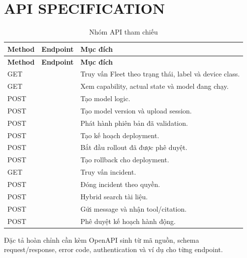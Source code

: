 \chapter{API SPECIFICATION}

\begin{longtable}{L{2.2cm}L{5cm}L{7.2cm}}
\caption{Nhóm API tham chiếu}\label{tab:api-specification}\\
\toprule
\textbf{Method} & \textbf{Endpoint} & \textbf{Mục đích}\\
\midrule\endfirsthead
\toprule
\textbf{Method} & \textbf{Endpoint} & \textbf{Mục đích}\\
\midrule\endhead
GET &  & Truy vấn Fleet theo trạng thái, label và device class.\\
GET &  & Xem capability, actual state và model đang chạy.\\
POST &  & Tạo model logic.\\
POST &  & Tạo model version và upload session.\\
POST &  & Phát hành phiên bản đã validation.\\
POST &  & Tạo kế hoạch deployment.\\
POST &  & Bắt đầu rollout đã được phê duyệt.\\
POST &  & Tạo rollback cho deployment.\\
GET &  & Truy vấn incident.\\
POST &  & Đóng incident theo quyền.\\
POST &  & Hybrid search tài liệu.\\
POST &  & Gửi message và nhận tool/citation.\\
POST &  & Phê duyệt kế hoạch hành động.\\
\bottomrule
\end{longtable}

Đặc tả hoàn chỉnh cần kèm OpenAPI sinh từ mã nguồn, schema request/response,
error code, authentication và ví dụ cho từng endpoint.